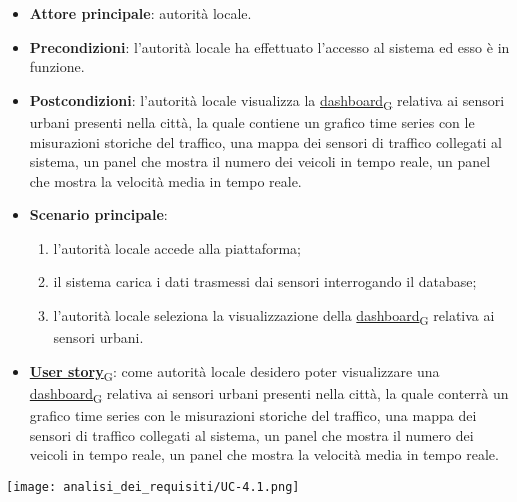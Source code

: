 \newpage
{}
\begin{itemize}
	\item \textbf{Attore principale}: autorità locale.
	\item \textbf{Precondizioni}: l'autorità locale ha effettuato l'accesso al sistema ed esso è in funzione.
	\item \textbf{Postcondizioni}: l'autorità locale visualizza la \href{https://7last.github.io/docs/pb/documentazione-interna/glossario\#dashboard}{dashboard\textsubscript{G}} relativa ai sensori urbani presenti nella città, la quale contiene un grafico time series con le misurazioni storiche del traffico, una mappa dei sensori di traffico collegati al sistema, un panel che mostra il numero dei veicoli in tempo reale, un panel che mostra la velocità media in tempo reale.
	\item \textbf{Scenario principale}:
	      \begin{enumerate}
		      \item l'autorità locale accede alla piattaforma;
		      \item il sistema carica i dati trasmessi dai sensori interrogando il database;
		      \item l'autorità locale seleziona la visualizzazione della \href{https://7last.github.io/docs/pb/documentazione-interna/glossario\#dashboard}{dashboard\textsubscript{G}} relativa ai sensori urbani.
	      \end{enumerate}
	\item \href{https://7last.github.io/docs/pb/documentazione-interna/glossario\#user-story}{\textbf{User story}\textsubscript{G}}:
	      come autorità locale desidero poter visualizzare una \href{https://7last.github.io/docs/pb/documentazione-interna/glossario\#dashboard}{dashboard\textsubscript{G}} relativa ai sensori urbani presenti nella città, la quale conterrà un grafico time series con le misurazioni storiche del traffico, una mappa dei sensori di traffico collegati al sistema, un panel che mostra il numero dei veicoli in tempo reale, un panel che mostra la velocità media in tempo reale.
\end{itemize}
\begin{center}
	\texttt{[image: analisi\_dei\_requisiti/UC-4.1.png]}
\end{center}

